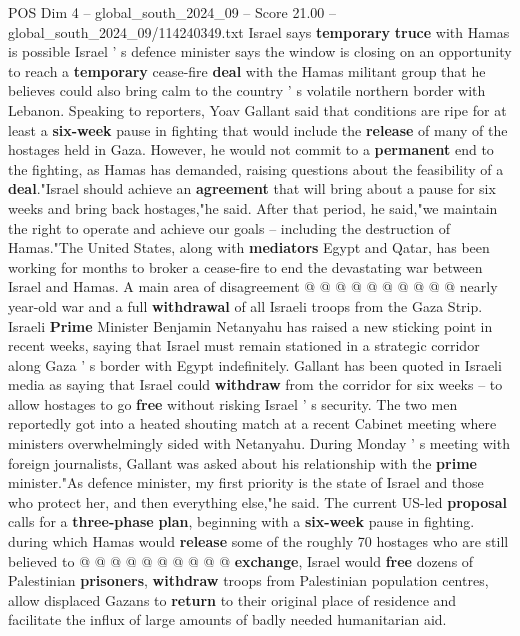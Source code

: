 \begin{textsample}{POS Dim 4 – global\_south\_2024\_09 – Score 21.00 – global\_south\_2024\_09/114240349.txt}  \label{ex:f4_pos_294}
Israel says \textbf{temporary} \textbf{truce} with Hamas is possible Israel ' s defence minister says the window is closing on an opportunity to reach a \textbf{temporary} cease-fire \textbf{deal} with the Hamas militant group that he believes could also bring calm to the country ' s volatile northern border with Lebanon.
Speaking to reporters, Yoav Gallant said that conditions are ripe for at least a \textbf{six-week} pause in fighting that would include the \textbf{release} of many of the hostages held in Gaza.
However, he would not commit to a \textbf{permanent} end to the fighting, as Hamas has demanded, raising questions about the feasibility of a \textbf{deal}."Israel should achieve an \textbf{agreement} that will bring about a pause for six weeks and bring back hostages,"he said.
After that period, he said,"we maintain the right to operate and achieve our goals -- including the destruction of Hamas."The United States, along with \textbf{mediators} Egypt and Qatar, has been working for months to broker a cease-fire to end the devastating war between Israel and Hamas.
A main area of disagreement @ @ @ @ @ @ @ @ @ @ nearly year-old war and a full \textbf{withdrawal} of all Israeli troops from the Gaza Strip.
Israeli \textbf{Prime} Minister Benjamin Netanyahu has raised a new sticking point in recent weeks, saying that Israel must remain stationed in a strategic corridor along Gaza ' s border with Egypt indefinitely.
Gallant has been quoted in Israeli media as saying that Israel could \textbf{withdraw} from the corridor for six weeks -- to allow hostages to go \textbf{free} without risking Israel ' s security.
The two men reportedly got into a heated shouting match at a recent Cabinet meeting where ministers overwhelmingly sided with Netanyahu.
During Monday ' s meeting with foreign journalists, Gallant was asked about his relationship with the \textbf{prime} minister."As defence minister, my first priority is the state of Israel and those who protect her, and then everything else,"he said.
The current US-led \textbf{proposal} calls for a \textbf{three-phase} \textbf{plan}, beginning with a \textbf{six-week} pause in fighting. during which Hamas would \textbf{release} some of the roughly 70 hostages who are still believed to @ @ @ @ @ @ @ @ @ @ \textbf{exchange}, Israel would \textbf{free} dozens of Palestinian \textbf{prisoners}, \textbf{withdraw} troops from Palestinian population centres, allow displaced Gazans to \textbf{return} to their original place of residence and facilitate the influx of large amounts of badly needed humanitarian aid.

\end{textsample}
